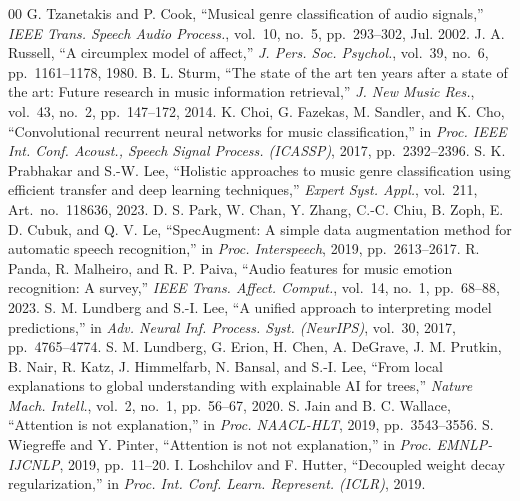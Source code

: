 \documentclass[conference]{IEEEtran}
\begin{document}
\begin{thebibliography}{00}
 G. Tzanetakis and P. Cook, ``Musical genre classification of audio signals,'' \textit{IEEE Trans. Speech Audio Process.}, vol.~10, no.~5, pp.~293--302, Jul. 2002.
 J. A. Russell, ``A circumplex model of affect,'' \textit{J. Pers. Soc. Psychol.}, vol.~39, no.~6, pp.~1161--1178, 1980.
 B. L. Sturm, ``The state of the art ten years after a state of the art: Future research in music information retrieval,'' \textit{J. New Music Res.}, vol.~43, no.~2, pp.~147--172, 2014.
 K. Choi, G. Fazekas, M. Sandler, and K. Cho, ``Convolutional recurrent neural networks for music classification,'' in \textit{Proc. IEEE Int. Conf. Acoust., Speech Signal Process. (ICASSP)}, 2017, pp.~2392--2396.
 S. K. Prabhakar and S.-W. Lee, ``Holistic approaches to music genre classification using efficient transfer and deep learning techniques,'' \textit{Expert Syst. Appl.}, vol.~211, Art.~no.~118636, 2023.
 D. S. Park, W. Chan, Y. Zhang, C.-C. Chiu, B. Zoph, E. D. Cubuk, and Q. V. Le, ``SpecAugment: A simple data augmentation method for automatic speech recognition,'' in \textit{Proc. Interspeech}, 2019, pp.~2613--2617.
 R. Panda, R. Malheiro, and R. P. Paiva, ``Audio features for music emotion recognition: A survey,'' \textit{IEEE Trans. Affect. Comput.}, vol.~14, no.~1, pp.~68--88, 2023.
 S. M. Lundberg and S.-I. Lee, ``A unified approach to interpreting model predictions,'' in \textit{Adv. Neural Inf. Process. Syst. (NeurIPS)}, vol.~30, 2017, pp.~4765--4774.
 S. M. Lundberg, G. Erion, H. Chen, A. DeGrave, J. M. Prutkin, B. Nair, R. Katz, J. Himmelfarb, N. Bansal, and S.-I. Lee, ``From local explanations to global understanding with explainable AI for trees,'' \textit{Nature Mach. Intell.}, vol.~2, no.~1, pp.~56--67, 2020.
 S. Jain and B. C. Wallace, ``Attention is not explanation,'' in \textit{Proc. NAACL-HLT}, 2019, pp.~3543--3556.
 S. Wiegreffe and Y. Pinter, ``Attention is not not explanation,'' in \textit{Proc. EMNLP-IJCNLP}, 2019, pp.~11--20.
 I. Loshchilov and F. Hutter, ``Decoupled weight decay regularization,'' in \textit{Proc. Int. Conf. Learn. Represent. (ICLR)}, 2019.
\end{thebibliography}
\end{document}
